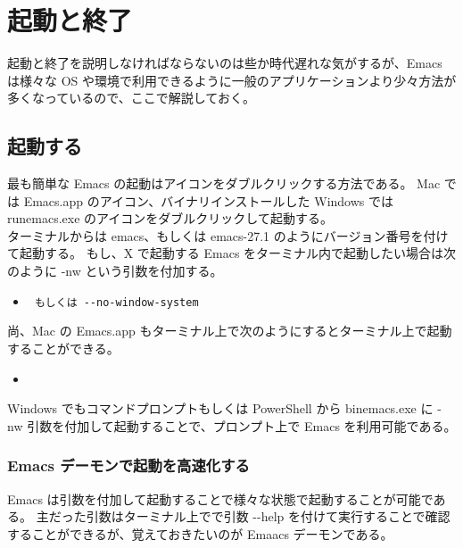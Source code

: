 \section{起動と終了}
起動と終了を説明しなければならないのは些か時代遅れな気がするが、Emacs は様々な OS や環境で利用できるように一般のアプリケーションより少々方法が多くなっているので、ここで解説しておく。
\subsection{起動する}
最も簡単な Emacs の起動はアイコンをダブルクリックする方法である。
Mac では Emacs.app のアイコン、バイナリインストールした Windows では runemacs.exe のアイコンをダブルクリックして起動する。\\

ターミナルからは emacs、もしくは emacs-27.1 のようにバージョン番号を付けて起動する。
もし、X で起動する Emacs をターミナル内で起動したい場合は次のように -nw という引数を付加する。
\begin{itemize}\setlength{\leftskip}{-1.00zw}%
\item[] \texttt{ もしくは \texttt{-{}-no-window-system}}
\end{itemize}
尚、Mac の Emacs.app もターミナル上で次のようにするとターミナル上で起動することができる。
\begin{itemize}\setlength{\leftskip}{-1.00zw}%
\item[]\texttt{}
\end{itemize}
Windows でもコマンドプロンプトもしくは PowerShell から bin\textyen{}emacs.exe に -nw 引数を付加して起動することで、プロンプト上で Emacs を利用可能である。
\subsubsection{Emacs デーモンで起動を高速化する}
Emacs は引数を付加して起動することで様々な状態で起動することが可能である。
主だった引数はターミナル上でで引数 -{}-help を付けて実行することで確認することができるが、覚えておきたいのが Emaacs デーモンである。\\

